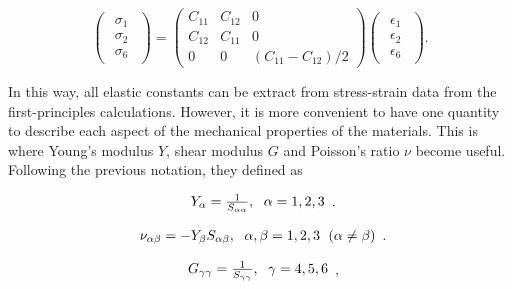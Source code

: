 \begin{equation}
\begin{pmatrix} \begin{array}{c} \sigma_1 \\ \sigma_2 \\ \sigma_6 \end{array} 
\end{pmatrix}
=
 \begin{pmatrix}
  C_{11} & C_{12} & 0  \\
  C_{12} & C_{11} & 0  \\
  0 & 0 & (C_{11}-C_{12})/2
 \end{pmatrix}
 \begin{pmatrix} \begin{array}{c} \epsilon_1 \\ \epsilon_2 \\ \epsilon_6 
\end{array} \end{pmatrix}.
\end{equation} 

In this way, all elastic constants can be extract from stress-strain data from the first-principles calculations. However, it is more convenient to have one quantity to describe each aspect of the mechanical properties of the materials. This is where Young's modulus $Y$, shear modulus $G$ and Poisson's ratio $\nu$ become useful. Following the previous notation, they defined as 

\begin{equation}
\begin{array}{c}

Y_\alpha=\frac{1}{S_{\alpha\alpha}},\hspace{6 pt} \alpha = 1, 2, 3
\end{array}.
\end{equation}

\begin{equation}
\begin{array}{c}
\nu_{\alpha\beta}=-Y_\beta S_{\alpha\beta},\hspace{6 pt} \alpha, \beta = 1, 2, 3 
\hspace{6 pt}(\alpha\neq\beta)
\end{array}.
\end{equation}

\begin{equation}
\begin{array}{c}
G_{\gamma\gamma}=\frac{1}{S_{\gamma\gamma}} ,\hspace{6 pt} \gamma = 4, 5, 6
\end{array},
\end{equation}


